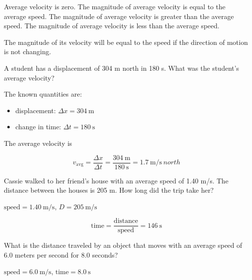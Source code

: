 \documentclass[]{exam}
\begin{document}
\begin{questions}
\begin{questions}
\begin{choices}
\choice Average velocity is zero.
\CorrectChoice The magnitude of average velocity is equal to the average speed.
\choice The magnitude of average velocity is greater than the average speed.
\choice The magnitude of average velocity is less than the average speed.
\end{choices}

\begin{solution}
The magnitude of its velocity will be equal to the speed if the direction of motion is not changing.
\end{solution}


\question
A student has a displacement of 304 m north in 180 s. What was the student's average velocity?

\begin{solution}
The known quantities are:

\begin{itemize}
    \item displacement: $\Delta{x} = \SI{304}{\meter}$
    \item change in time: $\Delta{t} = \SI{180}{\second}$
\end{itemize}

The average velocity is

\begin{equation*}
    v_{\mathrm{avg}} = \frac{\Delta{x}}{\Delta{t}} = \frac{\SI{304}{\meter}}{\SI{180}{\second}} = \SI[per-mode=symbol]{1.7}{\meter\per\second\ north}
\end{equation*}
\end{solution}



\question
Cassie walked to her friend’s house with an average speed of 1.40 m/s. The distance between the houses is 205 m. How long did the trip take her?

\begin{solution}
    $\text{speed} = \SI{1.40}{\meter/\second}$, $D = \SI{205}{\meter/\second}$

\begin{equation*}
    \text{time} = \frac{\text{distance}}{\text{speed}} = \SI{146}{\second}
\end{equation*}
\end{solution}

\question
What is the distance traveled by an object that moves with an average speed of 6.0 meters per second for 8.0 seconds?

\begin{solution}
    $\text{speed} = \SI{6.0}{\meter/\second}$, $\text{time} = \SI{8.0}{\second}$


\end{solution}
\end{questions}
\end{questions}
\end{document}
